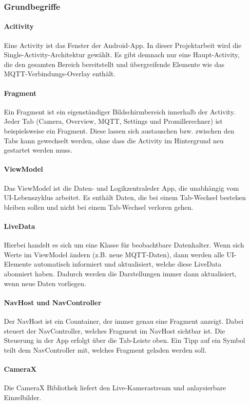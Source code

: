 \subsubsection{Grundbegriffe}
\paragraph{Acitivity}
Eine Activity ist das \glqq Fenster \grqq der Android-App. In dieser Projektarbeit wird die Single-Activity-Architektur gewählt. Es gibt demnach nur eine Haupt-Activity, die den gesamten Bereich bereitstellt und übergreifende Elemente wie das MQTT-Verbindungs-Overlay enthält.

\paragraph{Fragment}
Ein Fragment ist ein eigenständiger Bildschirmbereich innerhalb der Activity. Jeder Tab (Camera, Overview, MQTT, Settings und Promillerechner) ist beispielsweise ein Fragment. Diese lassen sich austauschen bzw. zwischen den Tabs kann gewechselt werden, ohne dass die Activity im Hintergrund neu gestartet werden muss.

\paragraph{ViewModel}
Das ViewModel ist die \glqq Daten- und Logikzentrale\grqq der App, die unabhängig vom UI-Lebenszyklus arbeitet. Es enthält Daten, die bei einem Tab-Wechsel bestehen bleiben sollen und nicht bei einem Tab-Wechsel verloren gehen.

\paragraph{LiveData}
Hierbei handelt es sich um eine Klasse für beobachtbare Datenhalter. Wenn sich Werte im ViewModel ändern (z.B. neue MQTT-Daten), dann werden alle UI-Elemente automatisch informiert und aktualisiert, welche diese LiveData abonniert haben. Dadurch werden die Darstellungen immer dann aktualisiert, wenn neue Daten vorliegen.

\paragraph{NavHost und NavController}
Der NavHost ist ein Countainer, der immer genau eine Fragment anzeigt. Dabei steuert der NavController, welches Fragment im NavHost sichtbar ist. Die Steuerung in der App erfolgt über die Tab-Leiste oben. Ein Tipp auf ein Symbol teilt dem NavController mit, welches Fragment geladen werden soll.

\paragraph{CameraX}
Die CameraX Bibliothek liefert den Live-Kamerastream und anlaysierbare Einzelbilder.

\clearpage